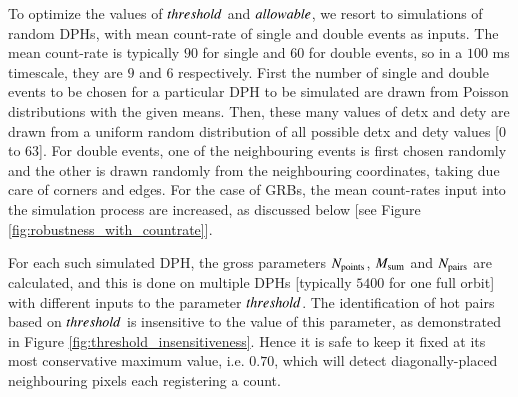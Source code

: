 To optimize the values of $threshold$ and $allowable$, we resort to simulations of random DPHs, with mean count-rate of single and double events as inputs. The mean count-rate is typically $90$ for single and $60$ for double events, so in a $100$ ms timescale, they are $9$ and $6$ respectively. First the number of single and double events to be chosen for a particular DPH to be simulated are drawn from Poisson distributions with the given means. Then, these many values of detx and dety are drawn from a uniform random distribution of all possible detx and dety values [$0$ to $63$]. For double events, one of the neighbouring events is first chosen randomly and the other is drawn randomly from the neighbouring coordinates, taking due care of corners and edges. For the case of GRBs, the mean count-rates input into the simulation process are increased, as discussed below [see Figure \ref{fig:robustness_with_countrate}].

For each such simulated DPH, the gross parameters $N_{\rm{points}}$, $M_{\rm{sum}}$ and $N_{\rm{pairs}}$ are calculated, and this is done on multiple DPHs [typically $5400$ for one full orbit] with different inputs to the parameter $threshold$. The identification of hot pairs based on $threshold$ is insensitive to the value of this parameter, as demonstrated in Figure \ref{fig:threshold_insensitiveness}. Hence it is safe to keep it fixed at its most conservative maximum value, i.e. $0.70$, which will detect diagonally-placed neighbouring pixels each registering a count.





